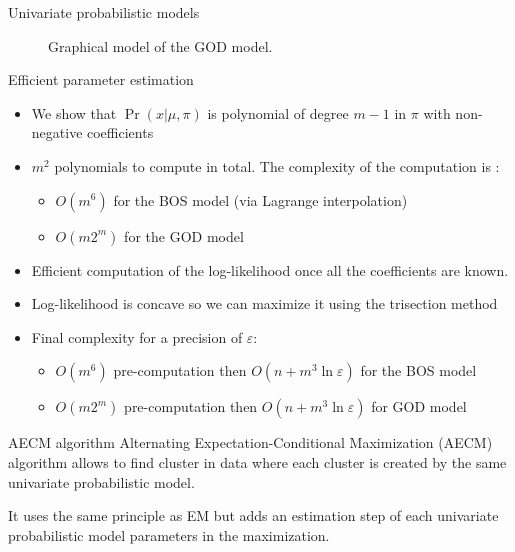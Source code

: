 \documentclass{beamer}
\renewcommand{\epsilon}{\varepsilon}
\begin{document}
\begin{frame}{Univariate probabilistic models}
\begin{figure}[htbp]
        \caption*{Graphical model of the GOD model.}
        \label{fig:god_graphical_model}
    \end{figure}
\end{frame}

\begin{frame}{Efficient parameter estimation}
    \begin{itemize}
        \item We show that \(\Pr(x | \mu, \pi)\) is polynomial of degree \(m - 1\) in $\pi$ with non-negative coefficients
        \item $m^2$ polynomials to compute in total. The complexity of the computation is :
              \begin{itemize}
                  \item $O(m^6)$ for the BOS model (via Lagrange interpolation)
                  \item $O(m 2^m)$ for the GOD model
              \end{itemize}
        \item Efficient computation of the log-likelihood once all the coefficients are known.
        \item Log-likelihood is concave so we can maximize it using the trisection method
        \item Final complexity for a precision of $\epsilon$:\begin{itemize}
                  \item $O(m^6)$ pre-computation then $O(n + m^3 \ln \epsilon)$ for the BOS model
                        \item$O(m2^m)$ pre-computation then $O(n + m^3 \ln \epsilon)$ for GOD model
              \end{itemize}
    \end{itemize}
\end{frame}

\begin{frame}{AECM algorithm}
    Alternating Expectation-Conditional Maximization (AECM) algorithm allows to find cluster in data where each cluster is created by the same univariate probabilistic model.

    It uses the same principle as EM but adds an estimation step of each univariate probabilistic model parameters in the maximization.
\end{frame}
\end{document}
